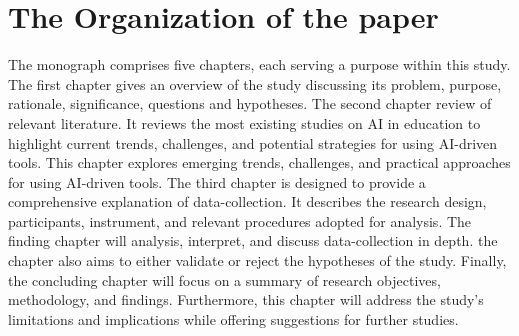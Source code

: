 

\section{The Organization of the paper}\label{sec:the-organization-of-the-paper}
\justifying
The monograph comprises five chapters, each serving a purpose within this study.
The first chapter gives an overview of the study discussing its problem,
purpose, rationale, significance, questions and hypotheses.
The second chapter review of relevant literature.
It reviews the most existing studies on AI in education to highlight current
trends, challenges, and potential strategies for using AI-driven tools.
This chapter explores emerging trends, challenges, and practical approaches for using AI-driven tools.
The third chapter is designed to provide a comprehensive explanation of data-collection.
It describes the research design, participants, instrument, and relevant procedures
adopted for analysis.
The finding chapter will analysis, interpret, and discuss data-collection in depth.
the chapter also aims to either validate or reject the hypotheses of the study.
Finally, the concluding chapter will focus on a summary of research objectives, methodology, and findings.
Furthermore,
this chapter will address the study's limitations and implications while offering suggestions for further studies.



